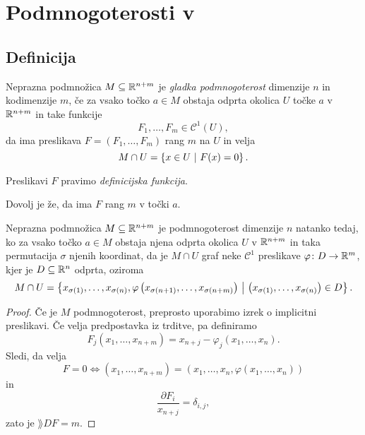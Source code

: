 \section{Podmnogoterosti v }

\subsection{Definicija}


\begin{definicija}
Neprazna podmnožica $M \subseteq \mathbb{R}^{n+m}$ je
\emph{gladka podmnogoterost} dimenzije $n$ in
kodimenzije $m$, če za vsako točko $a \in M$ obstaja odprta okolica
$U$ točke $a$ v $\mathbb{R}^{n+m}$ in take funkcije
\[
F_1, \dots, F_m \in \mathcal{C}^1(U),
\]
da ima preslikava $F = (F_1, \dots, F_m)$ rang $m$ na $U$ in velja
\[
M \cap U = \left\{x \in U~\middle\vert~F(x) = 0\right\}.
\]
\end{definicija}

\begin{opomba}
Preslikavi $F$ pravimo
\emph{definicijska funkcija}.
\end{opomba}

\begin{opomba}
Dovolj je že, da ima $F$ rang $m$ v točki $a$.
\end{opomba}

\begin{trditev}
Neprazna podmnožica $M \subseteq \mathbb{R}^{n+m}$ je podmnogoterost
dimenzije $n$ natanko tedaj, ko za vsako točko $a \in M$ obstaja
njena odprta okolica $U$ v $\mathbb{R}^{n+m}$ in taka permutacija $\sigma$
njenih koordinat, da je $M \cap U$ graf neke $\mathcal{C}^1$
preslikave $\varphi \colon D \to \mathbb{R}^m$, kjer je $D \subseteq \mathbb{R}^n$
odprta, oziroma
\[
M \cap U = \left\{x_{\sigma(1)}, \dots, x_{\sigma(n)},
\varphi\left(x_{\sigma(n+1)}, \dots, x_{\sigma(n+m)}\right)~\middle\vert~\left(x_{\sigma(1)}, \dots, x_{\sigma(n)}\right) \in D\right\}.
\]
\end{trditev}

\begin{proof}
Če je $M$ podmnogoterost, preprosto uporabimo izrek o implicitni
preslikavi. Če velja predpostavka iz trditve, pa definiramo
\[
F_j(x_1, \dots, x_{n+m}) = x_{n+j} - \varphi_j(x_1, \dots, x_n).
\]
Sledi, da velja
\[
F = 0 \iff (x_1, \dots, x_{n+m}) =
(x_1, \dots, x_n, \varphi(x_1, \dots, x_n))
\]
in
\[
\frac{\partial F_i}{x_{n+j}} = \delta_{i,j},
\]
zato je $\rang DF = m$.
\end{proof}

